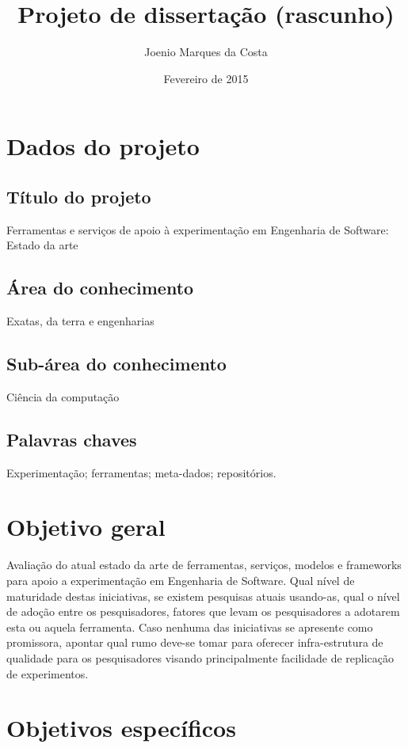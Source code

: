\documentclass[12pt]{article}
\title{Projeto de dissertação (rascunho)}
\author{Joenio Marques da Costa}
\date{Fevereiro de 2015}
\begin{document}
\maketitle

\section{Dados do projeto}

\subsection{Título do projeto}

Ferramentas e serviços de apoio à experimentação em Engenharia de Software: Estado da arte

\subsection{Área do conhecimento}

Exatas, da terra e engenharias

\subsection{Sub-área do conhecimento}

Ciência da computação

\subsection{Palavras chaves}

Experimentação; ferramentas; meta-dados; repositórios.

\section{Objetivo geral}

Avaliação do atual estado da arte de ferramentas, serviços, modelos e
frameworks para apoio a experimentação em Engenharia de Software. Qual nível
de maturidade destas iniciativas, se existem pesquisas atuais usando-as, qual
o nível de adoção entre os pesquisadores, fatores que levam os pesquisadores a
adotarem esta ou aquela ferramenta. Caso nenhuma das iniciativas se apresente
como promissora, apontar qual rumo deve-se tomar para oferecer infra-estrutura
de qualidade para os pesquisadores visando principalmente facilidade de
replicação de experimentos.

\section{Objetivos específicos}
\end{document}
